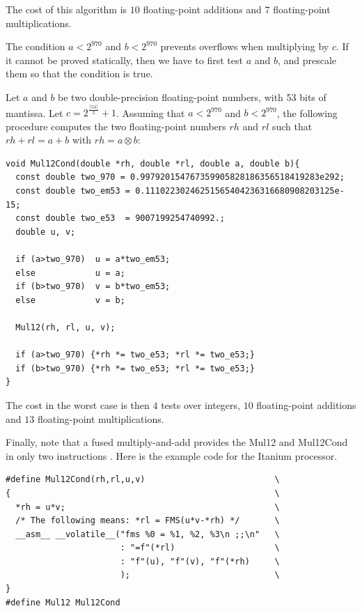 The cost of this algorithm is $10$ floating-point
additions and $7$ floating-point multiplications.



The condition $a<2^{970}$ and $b<2^{970}$ prevents overflows when
multiplying by $c$. If it cannot be proved statically, then we have to
first test $a$ and $b$, and prescale them so that the condition is
true.


\begin{theorem}
  Let $a$ and $b$ be two double-precision floating-point numbers, with
  53 bits of mantissa. Let $c=2^{\frac{\lceil 53 \rceil}{2}}+1$.
  Assuming that $a<2^{970}$ and $b<2^{970}$, the following procedure
  computes the two floating-point numbers $rh$ and $rl$ such that $rh
  + rl = a + b$ with $rh = a \otimes b$:

\begin{lstlisting}[label={lst:Mul12Cond},caption={Mul12Cond},firstnumber=1]
void Mul12Cond(double *rh, double *rl, double a, double b){
  const double two_970 = 0.997920154767359905828186356518419283e292;
  const double two_em53 = 0.11102230246251565404236316680908203125e-15;
  const double two_e53  = 9007199254740992.;
  double u, v;

  if (a>two_970)  u = a*two_em53; 
  else            u = a;
  if (b>two_970)  v = b*two_em53; 
  else            v = b;

  Mul12(rh, rl, u, v);

  if (a>two_970) {*rh *= two_e53; *rl *= two_e53;} 
  if (b>two_970) {*rh *= two_e53; *rl *= two_e53;} 
}\end{lstlisting}
\end{theorem}

The cost in the worst case is then $4$ tests over integers,
$10$ floating-point additions and $13$ floating-point multiplications.


Finally, note that a fused multiply-and-add provides the Mul12 and
Mul12Cond in only two instructions \cite{CorneaHarrisonTang2002}. Here
is the example code for the Itanium processor.

\begin{lstlisting}[label={lst:Mul12CondFMA},caption={Mul12 on the Itanium},firstnumber=1]
#define Mul12Cond(rh,rl,u,v)                          \
{                                                     \
  *rh = u*v;                                          \
  /* The following means: *rl = FMS(u*v-*rh) */       \
  __asm__ __volatile__("fms %0 = %1, %2, %3\n ;;\n"   \
                       : "=f"(*rl)                    \
                       : "f"(u), "f"(v), "f"(*rh)     \
                       );                             \
}
#define Mul12 Mul12Cond
\end{lstlisting}




